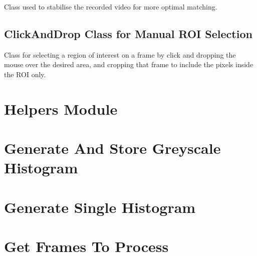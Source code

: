 Class used to stabilise the recorded video for more optimal matching.




\subsection{ClickAndDrop Class for Manual ROI Selection}
\label{sec:code-ClickAndDrop}

Class for selecting a region of interest on a frame by click and dropping the mouse over the desired area, and cropping that frame to include the pixels inside the ROI only.




\clearpage
\section{Helpers Module}

\section{Generate And Store Greyscale Histogram}
\label{sec:code-generate-and-store-greyscale-histogram}




\section{Generate Single Histogram}
\label{sec:code-generate-single-histogram}




\section{Get Frames To Process}
\label{sec:code-listings-get-frames-to-process}

